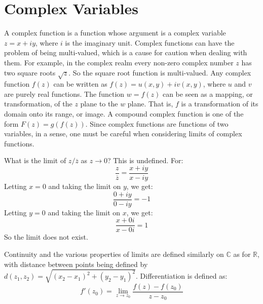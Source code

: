 \documentclass[crop=false,class=book,oneside]{standalone}                      %
\begin{document}
    \section{Complex Variables}
        A complex function is a function whose argument is a complex
        variable $z=x+iy$, where $i$ is the imaginary unit. Complex
        functions can have the problem of being multi-valued, which
        is a cause for caution when dealing with them. For example,
        in the complex realm every non-zero complex number $z$
        has two square roots $\sqrt{z}$. So the square root
        function is multi-valued. Any complex function $f(z)$ can
        be written as $f(z)=u(x,y)+iv(x,y)$, where $u$ and $v$ are
        purely real functions. The function $w=f(z)$ can be seen
        as a mapping, or transformation, of the $z$ plane to
        the $w$ plane. That is, $f$ is a transformation of
        its domain onto its range, or image. A compound complex
        function is one of the form $F(z)=g(f(z))$. Since complex
        functions are functions of two variables, in a sense, one
        must be careful when considering limits of complex functions.
        \begin{example}
            What is the limit of $z/\overline{z}$ as $z\rightarrow{0}$?
            This is undefined. For:
            \begin{equation*}
                \frac{z}{\overline{z}}=\frac{x+iy}{x-iy}
            \end{equation*}
            Letting $x=0$ and taking the limit on $y$,
            we get:
            \begin{equation*}
                \frac{0+iy}{0-iy}=-1
            \end{equation*}
            Letting $y=0$ and taking the limit on $x$,
            we get:
            \begin{equation*}
                \frac{x+0i}{x-0i}=1
            \end{equation*}
            So the limit does not exist.
        \end{example}
        Continuity and the various properties of limits
        are defined similarly on $\mathbb{C}$ as for
        $\mathbb{R}$, with distance between points being
        defined by
        $d(z_{1},z_{2})=\sqrt{(x_{2}-x_{1})^{2}+(y_{2}-y_{1})^{2}}$.
        Differentiation is defined as:
        \begin{equation*}
            f'(z_{0})=\lim_{z\rightarrow{z_{0}}}\frac{f(z)-f(z_{0})}{z-z_{0}}
        \end{equation*}
\end{document}
